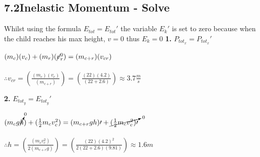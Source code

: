 \subsection*{7.2\hspace*{0.5cm}Inelastic Momentum - Solve}
Whilst using the formula $E_{tot} = E_{tot}\prime$ the variable $E_{k}\prime$ is set to zero because when the child reaches his max height, $v = 0$ thus $E_{k} = 0$\newline\newline
\textbf{1.} $P_{tot_{x}} = P_{tot_{x}}\prime$ \\
\begin{adjustwidth}{0.6cm}{0pt}
    $(m_{c})({v}_{c}) + (m_{r})(\cancel{v}_{r}^0) = (m_{c + r})(v_{cr})$ \\\\
    $\therefore v_{cr} = \left(\frac{(m_{c})(v_{c})}{(m_{c + r})}\right) = \left(\frac{(22)(4.2)}{(22 + 2.6)}\right) \approx 3.7\frac{m}{s}$
\end{adjustwidth}\vspace*{15pt}
\textbf{2.} $E_{tot_{y}} = E_{tot_{y}}\prime$ \\
\begin{adjustwidth}{0.6cm}{0pt}
    $(m_{c}g\cancelto{0}{h}) + (\frac{1}{2}m_{c}v_{c}^2) = (m_{c + r}gh)\prime + \cancelto{0}{(\frac{1}{2}m_{c}v_{c}^2)\prime}$ \\\\
    $\therefore h = \left(\frac{(m_{c}v_{c}^2)}{2(m_{c+r}g)}\right) = \left(\frac{(22){(4.2)}^2}{2(22 + 2.6)(9.81)}\right) \approx 1.6m$
\end{adjustwidth}\vspace*{15pt}
